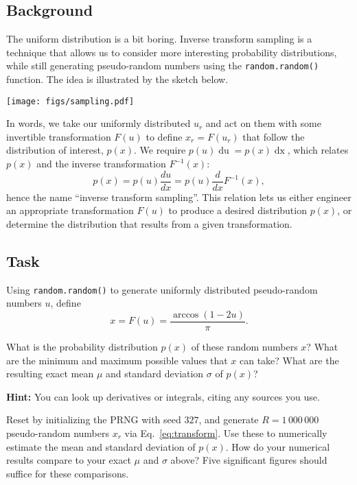 \documentclass[12 pt]{article} %
\newcommand{\si}{\ensuremath{\sigma} }
\renewcommand{\d}[1]{\ensuremath{\mathop{d#1}} }
\newcommand{\eq}[1]{Eq.~\ref{#1}}
\newcommand{\showmarks}[1]{\rightline{\texttt{[#1 marks]}}} %
\begin{document}
\subsection*{Background}
The uniform distribution is a bit boring.
Inverse transform sampling is a technique that allows us to consider more interesting probability distributions, while still generating pseudo-random numbers using the \texttt{random.random()} function.
The idea is illustrated by the sketch below.
\begin{center}
  \texttt{[image: figs/sampling.pdf]}
\end{center}

In words, we take our uniformly distributed $u_r$ and act on them with some invertible transformation $F(u)$ to define $x_r = F(u_r)$ that follow the distribution of interest, $p(x)$.
We require $p(u) \d{u} = p(x) \d{x}$, which relates $p(x)$ and the inverse transformation $F^{-1}(x)$:
\begin{equation}
  \label{eq:inverse}
  p(x) = p(u) \frac{du}{dx} = p(u) \frac{d}{dx} F^{-1}(x),
\end{equation}
hence the name ``inverse transform sampling''.
This relation lets us either engineer an appropriate transformation $F(u)$ to produce a desired distribution $p(x)$, or determine the distribution that results from a given transformation.

\newpage
\subsection*{Task}
Using \texttt{random.random()} to generate uniformly distributed pseudo-random numbers $u$, define
\begin{equation}
  \label{eq:transform}
  x = F(u) = \frac{\arccos\left(1 - 2u\right)}{\pi}.
\end{equation}

What is the probability distribution $p(x)$ of these random numbers $x$?
What are the minimum and maximum possible values that $x$ can take?
What are the resulting exact mean $\mu$ and standard deviation \si of $p(x)$?

\textbf{Hint:} You can look up derivatives or integrals, citing any sources you use.

\showmarks{5}

Reset by initializing the PRNG with seed $327$, and generate $R = 1\,000\,000$ pseudo-random numbers $x_r$ via \eq{eq:transform}.
Use these to numerically estimate the mean and standard deviation of $p(x)$.
How do your numerical results compare to your exact $\mu$ and \si above?
Five significant figures should suffice for these comparisons.
\end{document}
